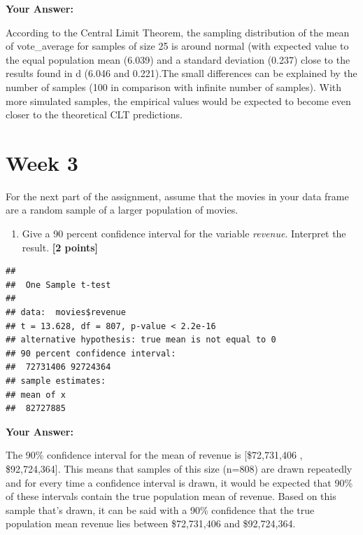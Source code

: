 \documentclass[
]{article}
\newenvironment{Shaded}{\begin{snugshade}}{\end{snugshade}}
\newcommand{\AttributeTok}[1]{\textcolor[rgb]{0.13,0.29,0.53}{#1}}
\newcommand{\CommentTok}[1]{\textcolor[rgb]{0.56,0.35,0.01}{\textit{#1}}}
\newcommand{\FloatTok}[1]{\textcolor[rgb]{0.00,0.00,0.81}{#1}}
\newcommand{\FunctionTok}[1]{\textcolor[rgb]{0.13,0.29,0.53}{\textbf{#1}}}
\newcommand{\NormalTok}[1]{#1}
\newcommand{\SpecialCharTok}[1]{\textcolor[rgb]{0.81,0.36,0.00}{\textbf{#1}}}
\providecommand{\tightlist}{%
  \setlength{\itemsep}{0pt}\setlength{\parskip}{0pt}}
\begin{document}
\textbf{Your Answer:}

According to the Central Limit Theorem, the sampling distribution of the
mean of vote\_average for samples of size 25 is around normal (with
expected value to the equal population mean (6.039) and a standard
deviation (0.237) close to the results found in d (6.046 and 0.221).The
small differences can be explained by the number of samples (100 in
comparison with infinite number of samples). With more simulated
samples, the empirical values would be expected to become even closer to
the theoretical CLT predictions.

\section{Week 3}\label{week-3}

For the next part of the assignment, assume that the movies in your data
frame are a random sample of a larger population of movies.

\begin{enumerate}
\def\labelenumi{\arabic{enumi}.}
\tightlist
\item
  Give a 90 percent confidence interval for the variable \emph{revenue}.
  Interpret the result. \textbf{[2 points]}
\end{enumerate}

\begin{Shaded}
\end{Shaded}

\begin{verbatim}
## 
##  One Sample t-test
## 
## data:  movies$revenue
## t = 13.628, df = 807, p-value < 2.2e-16
## alternative hypothesis: true mean is not equal to 0
## 90 percent confidence interval:
##  72731406 92724364
## sample estimates:
## mean of x 
##  82727885
\end{verbatim}

\textbf{Your Answer:}

The 90\% confidence interval for the mean of revenue is {[}\$72,731,406
, \$92,724,364{]}. This means that samples of this size (n=808) are
drawn repeatedly and for every time a confidence interval is drawn, it
would be expected that 90\% of these intervals contain the true
population mean of revenue. Based on this sample that's drawn, it can be
said with a 90\% confidence that the true population mean revenue lies
between \$72,731,406 and \$92,724,364.
\end{document}

